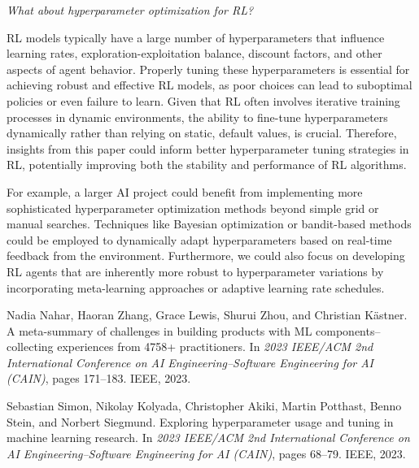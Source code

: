 \documentclass[11pt]{article}
\begin{document}
\textit{What about hyperparameter optimization for RL?} 

RL models typically have a large number of hyperparameters that influence learning rates, exploration-exploitation balance, discount factors, and other aspects of agent behavior. Properly tuning these hyperparameters is essential for achieving robust and effective RL models, as poor choices can lead to suboptimal policies or even failure to learn. Given that RL often involves iterative training processes in dynamic environments, the ability to fine-tune hyperparameters dynamically rather than relying on static, default values, is crucial. Therefore, insights from this paper could inform better hyperparameter tuning strategies in RL, potentially improving both the stability and performance of RL algorithms.

For example, a larger AI project could benefit from implementing more sophisticated hyperparameter optimization methods beyond simple grid or manual searches. Techniques like Bayesian optimization or bandit-based methods could be employed to dynamically adapt hyperparameters based on real-time feedback from the environment. Furthermore, we could also focus on developing RL agents that are inherently more robust to hyperparameter variations by incorporating meta-learning approaches or adaptive learning rate schedules. 


\begin{thebibliography}{9}

Nadia Nahar, Haoran Zhang, Grace Lewis, Shurui Zhou, and Christian K{\"a}stner.
\newblock A meta-summary of challenges in building products with ML components--collecting experiences from 4758+ practitioners.
\newblock In \emph{2023 IEEE/ACM 2nd International Conference on AI Engineering--Software Engineering for AI (CAIN)}, pages 171--183. IEEE, 2023.

Sebastian Simon, Nikolay Kolyada, Christopher Akiki, Martin Potthast, Benno Stein, and Norbert Siegmund.
\newblock Exploring hyperparameter usage and tuning in machine learning research.
\newblock In \emph{2023 IEEE/ACM 2nd International Conference on AI Engineering--Software Engineering for AI (CAIN)}, pages 68--79. IEEE, 2023.

\end{thebibliography}
\end{document}
